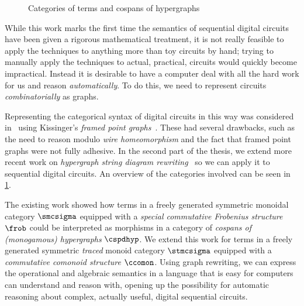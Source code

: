 \begin{figure}
    \centering
    
    \caption{Categories of terms and cospans of hypergraphs}
    \label{fig:hypergraphs-map}
\end{figure}

While this work marks the first time the semantics of sequential digital
circuits have been given a rigorous mathematical treatment, it is not really
feasible to apply the techniques to anything more than toy circuits by hand;
trying to manually apply the techniques to actual, practical, circuits would
quickly become impractical.
Instead it is desirable to have a computer deal with all the hard work
for us and reason \emph{automatically}.
To do this, we need to represent circuits \emph{combinatorially} as graphs.

Representing the categorical syntax of digital circuits in this way was
considered in~\cite{ghica2017diagrammatic} using
Kissinger's \emph{framed point graphs}~\cite{kissinger2012pictures}.
These had several drawbacks, such as the need to reason modulo
\emph{wire homeomorphism} and the fact that framed point graphs were not fully
adhesive.
In the second part of the thesis, we extend more recent work on
\emph{hypergraph string diagram rewriting}~\cite{bonchi2022string,bonchi2022stringa,bonchi2022stringb}
so we can apply it to sequential digital circuits.
An overview of the categories involved can be seen in
\cref{fig:hypergraphs-map}.

The existing work showed how terms in a freely generated symmetric monoidal
category \(\smcsigma\) equipped with a
\emph{special commutative Frobenius structure} \(\frob\) could be interpreted as
morphisms in a category of
\emph{cospans of (monogamous) hypergraphs} \(\cspdhyp\).
We extend this work for terms in a freely generated symmetric \emph{traced}
monoid category \(\stmcsigma\) equipped with a
\emph{commutative comonoid structure} \(\ccomon\).
Using graph rewriting, we can express the operational and algebraic semantics
in a language that is easy for computers can understand and reason with, opening
up the possibility for automatic reasoning about complex, actually useful,
digital sequential circuits.
